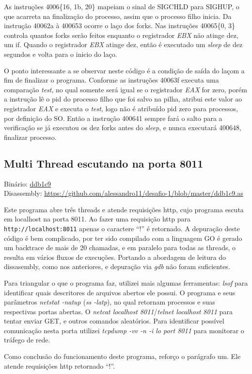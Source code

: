

As instruções 4006\{16, 1b, 20\} mapeiam o sinal de SIGCHLD para
SIGHUP, o que acarreta na finalização do processo, assim que o processo
filho inicia. Da instrução 40062a à 400653 ocorre o laço dos
forks. Nas instruções 40065\{0, 3\} controla quantos forks serão
feitos enquanto o registrador \emph{EBX} não atinge dez, um if. Quando o
registrador \emph{EBX} atinge dez, então é executado um \emph{sleep} de dez
segundos e volta para o inicio do laço.

O ponto interessante a se observar neste código é a condição de saída do
laçom a fim de finalizar o programa. Conforme as instruções 40063f executa uma comparação
\emph{test}, no qual somente será igual se o registrador \emph{EAX} for zero,
porém a instrução lê o pid do processo filho que foi salvo na pilha,
atribui este valor ao registrador \emph{EAX} e executa o \emph{test}, logo
não é atribuído pid zero para processos, por definição do SO. Então a
instrução 400641 sempre fará o salto para a verificação se já executou
os dez forks antes do \emph{sleep}, e nunca executará 400648,
finalizar processo.


\subsection{Multi Thread escutando na porta 8011}
\noindent Binário: \href{https://s3.amazonaws.com/chaordic-desafio-cloud/ddb1c9}{ddb1c9}\\
Disassembly:
\href{https://github.com/alessandro11/desafio-1/blob/master/ddb1c9.as}{https://github.com/alessandro11/desafio-1/blob/master/ddb1c9.as}\\

\par Este programa abre três threads e atende requisições http,
cujo programa escuta em localhost na porta 8011. Ao fazer uma
requisição http para \texttt{http://localhost:8011} apenas o caractere
``!'' é retornado. A depuração deste código é bem complicado, por ter
sido compilado com a linguagem GO é gerado um backtrace de mais de 20
chamadas, e em paralelo para todas as threads, o resulta em vários
fluxos de execuções. Portando a abordagem de leitura do dissasembly,
como nos anteriores, e depuração via \emph{gdb} não foram
suficientes.

Para triangular o que o programa faz, utilizei mais algumas
ferramentas: \emph{lsof} para identificar quais descritores de
arquivos abertos ele possui. O programa e seus parâmetros \emph{netstat -natup}
(\emph{ss -latp}), no qual retornam processos e suas respectivas portas
abertas. O \emph{netcat localhost 8011}/\emph{telnet localhost 8011}
para tentar enviar GET, e outros comandos aleatórios. Para identificar
possível comunicação nesta porta utilizei \emph{tcpdump -vv -n -i lo
  port 8011} para monitorar o tráfego de rede.

Como conclusão do funcionamento deste programa, reforço o parágrafo
um. Ele atende requisições http retornado ``!''.
